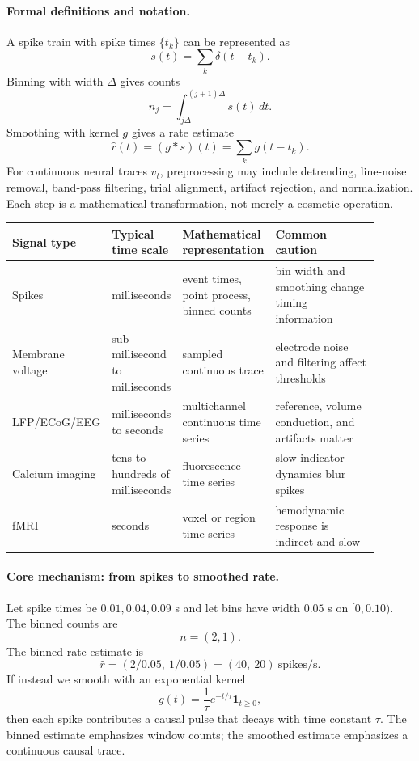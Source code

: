 \paragraph{Formal definitions and notation.}
A spike train with spike times \(\{t_k\}\) can be represented as
\[
s(t)=\sum_k \delta(t-t_k).
\]
Binning with width \(\Delta\) gives counts
\[
n_j=\int_{j\Delta}^{(j+1)\Delta}s(t)\,dt.
\]
Smoothing with kernel \(g\) gives a rate estimate
\[
\hat r(t)=(g*s)(t)=\sum_k g(t-t_k).
\]
For continuous neural traces \(v_t\), preprocessing may include detrending, line-noise removal, band-pass filtering, trial alignment, artifact rejection, and normalization. Each step is a mathematical transformation, not merely a cosmetic operation.

\begin{center}
\small
\renewcommand{\arraystretch}{1.18}
\begin{tabular}{p{0.18\linewidth}p{0.18\linewidth}p{0.24\linewidth}p{0.30\linewidth}}
\toprule
Signal type & Typical time scale & Mathematical representation & Common caution \\
\midrule
Spikes & milliseconds & event times, point process, binned counts & bin width and smoothing change timing information \\
Membrane voltage & sub-millisecond to milliseconds & sampled continuous trace & electrode noise and filtering affect thresholds \\
LFP/ECoG/EEG & milliseconds to seconds & multichannel continuous time series & reference, volume conduction, and artifacts matter \\
Calcium imaging & tens to hundreds of milliseconds & fluorescence time series & slow indicator dynamics blur spikes \\
fMRI & seconds & voxel or region time series & hemodynamic response is indirect and slow \\
\bottomrule
\end{tabular}
\end{center}

\paragraph{Core mechanism: from spikes to smoothed rate.}
Let spike times be \(0.01,0.04,0.09\) s and let bins have width \(0.05\) s on \([0,0.10)\). The binned counts are
\[
n=(2,1).
\]
The binned rate estimate is
\[
\hat r=(2/0.05,\ 1/0.05)=(40,\ 20)\ \text{spikes/s}.
\]
If instead we smooth with an exponential kernel
\[
g(t)=\frac{1}{\tau}e^{-t/\tau}\mathbf 1_{t\geq0},
\]
then each spike contributes a causal pulse that decays with time constant \(\tau\). The binned estimate emphasizes window counts; the smoothed estimate emphasizes a continuous causal trace.

